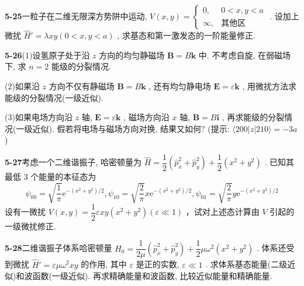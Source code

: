 \vfill

\newpage

\textbf{5-25}\quad 一粒子在二维无限深方势阱中运动, $\displaystyle V(x,y) = \begin{cases} 0, & 0 < x, y < a \\ \infty, & \text{其他区} \end{cases}$ . 设加上微扰 $\displaystyle \hat{H}' = \lambda xy (0 < x, y < a)$ , 求基态和第一激发态的一阶能量修正.

\vfill

\newpage

\textbf{5-26}\quad (1)设氢原子处于沿 $\displaystyle z$ 方向的均匀静磁场 $\displaystyle \pmb{B} = B\pmb{k}$ 中. 不考虑自旋, 在弱磁场下, 求 $\displaystyle n = 2$ 能级的分裂情况.

(2)如果沿 $\displaystyle z$ 方向不仅有静磁场 $\displaystyle \pmb{B} = B\pmb{k}$ , 还有均匀静电场 $\displaystyle \pmb{E} = \varepsilon \pmb{k}$ , 用微扰方法求能级的分裂情况(一级近似).

(3)如果电场方向沿 $\displaystyle z$ 轴, $\displaystyle \pmb{E} = \varepsilon \pmb{k}$ , 磁场方向沿 $\displaystyle x$ 轴, $\displaystyle \pmb{B} = B\pmb{i}$ , 再求能级的分裂情况(一级近似). 假若将电场与磁场方向对换, 结果又如何? (提示: $\displaystyle \langle 200|z|210\rangle = -3a$ )

\vfill

\newpage

\textbf{5-27}\quad 考虑一个二维谐振子, 哈密顿量为 $\displaystyle \hat{H} = \dfrac{1}{2} (\hat{p}_x^2 + \hat{p}_y^2) + \dfrac{1}{2} (x^2 + y^2)$ . 已知其最低 3 个能量的本征态为
$$
\psi_ {0 0} = \sqrt {\dfrac {1}{\pi}} \mathrm{e} ^ {- (x ^ {2} + y ^ {2}) / 2}, \psi_ {1 0} = \sqrt {\dfrac {2}{\pi}} x \mathrm{e} ^ {- (x ^ {2} + y ^ {2}) / 2}, \psi_ {0 1} = \sqrt {\dfrac {2}{\pi}} y \mathrm{e} ^ {- (x ^ {2} + y ^ {2}) / 2}
$$
设有一微扰 $\displaystyle V(x,y) = \dfrac{1}{2}\varepsilon xy(x^2 +y^2)(\varepsilon \ll 1)$ ，试对上述态计算由 $\displaystyle V$ 引起的一级微扰修正.

\vfill

\newpage

\textbf{5-28}\quad 二维谐振子体系哈密顿量 $\displaystyle \hat{H}_0 = \dfrac{1}{2\mu}\left(\hat{p}_x^2 +\hat{p}_y^2\right) + \dfrac{1}{2}\mu \omega^2\left(x^2 +y^2\right)$ . 体系还受到微扰 $\displaystyle \hat{H}' = \varepsilon \mu \omega^2 xy$ 的作用, 其中 $\displaystyle \varepsilon$ 是正的实数, $\displaystyle \varepsilon \ll 1$ . 求体系基态能量(二级近似)和波函数(一级近似). 再求精确能量和波函数, 比较近似能量和精确能量.

